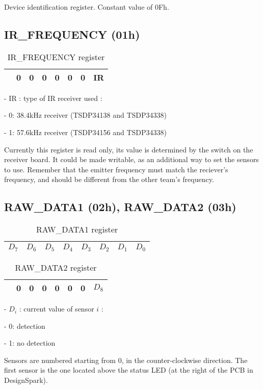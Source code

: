 \documentclass[a4paper,11pt]{article}
\begin{document}
Device identification register. Constant value of 0Fh.

\subsection{IR\_FREQUENCY (01h)}

\begin{table}[H]
\centering
\caption{IR\_FREQUENCY register}
\begin{tabularx}{\textwidth}{|Y|Y|Y|Y|Y|Y|Y|Y|}
\hline
{} & 0 & 0 & 0 & 0 & 0 & 0 & IR \\ \hline  
\end{tabularx}
\end{table}

\par - IR : type of IR receiver used :
\par \qquad - 0: 38.4kHz receiver (TSDP34138 and TSDP34338)
\par \qquad - 1: 57.6kHz receiver (TSDP34156 and TSDP34338)
\par Currently this register is read only, its value is determined by the switch on the receiver board. It could be made writable, as an additional way to set the sensors to use. Remember that the emitter frequency must match the reciever's frequency, and should be different from the other team's frequency.

\subsection{RAW\_DATA1 (02h), RAW\_DATA2 (03h)}

\begin{table}[H]
\centering
\caption{RAW\_DATA1 register}
\begin{tabularx}{\textwidth}{|Y|Y|Y|Y|Y|Y|Y|Y|}
\hline
\centering $D_7$ & $D_6$ & $D_5$ & $D_4$ & $D_3$ & $D_2$ & $D_1$ & $D_0$ \\ \hline  
\end{tabularx}
\end{table}

\begin{table}[H]
\centering
\caption{RAW\_DATA2 register}
\begin{tabularx}{\textwidth}{|Y|Y|Y|Y|Y|Y|Y|Y|}
\hline
{} & 0 & 0 & 0 & 0 & 0 & 0 & $D_8$ \\ \hline  
\end{tabularx}
\end{table}

\par - $D_i$ : current value of sensor $i$ :
\par \qquad - 0: detection
\par \qquad - 1: no detection
\par Sensors are numbered starting from 0, in the counter-clockwise direction. The first sensor is the one located above the status LED (at the right of the PCB in DesignSpark).
\end{document}

